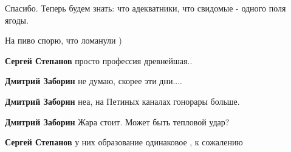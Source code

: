 \begin{itemize}
Спасибо. Теперь будем знать: что адекватники, что свидомые - одного поля ягоды.


\begin{itemize}
 
На пиво спорю, что ломанули )

 
\textbf{Сергей Степанов} просто профессия древнейшая..

 
\textbf{Дмитрий Заборин} не думаю, скорее эти дни....

 
\textbf{Дмитрий Заборин} неа, на Петиных каналах гонорары больше.

 
\textbf{Дмитрий Заборин} Жара стоит. Может быть тепловой удар?

 
\textbf{Сергей Степанов} у них образование одинаковое , к сожалению

 

\end{itemize}
\end{itemize}

